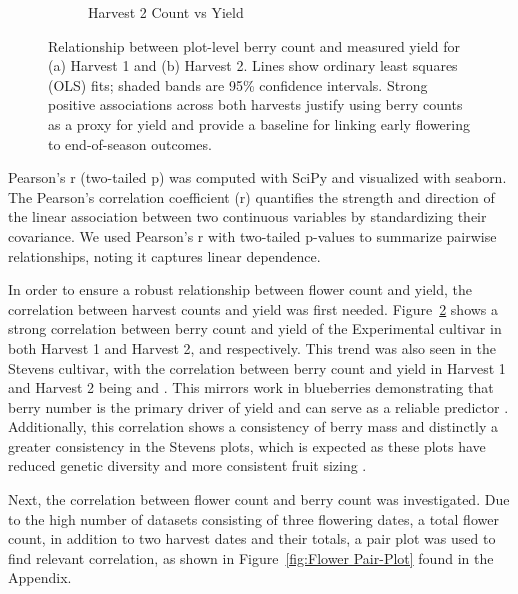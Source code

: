 \begin{figure}[!ht]
\begin{subfigure}{0.45\textwidth}
   \caption{Harvest 2 Count vs Yield}
    \label{fig:H2 count to yield}
  \end{subfigure}
  \caption{Relationship between plot-level berry count and measured yield for (a) Harvest 1 and (b) Harvest 2. Lines show ordinary least squares (OLS) fits; shaded bands are 95\% confidence intervals. Strong positive associations across both harvests justify using berry counts as a proxy for yield and provide a baseline for linking early flowering to end-of-season outcomes.}
  \label{fig:Harvest count comparison}
\end{figure}

 Pearson’s r (two-tailed p) was computed with SciPy \cite{virtanen_scipy_2020} and visualized with seaborn.\cite{waskom_seaborn_2021} The Pearson’s correlation coefficient (r) quantifies the strength and direction of the linear association between two continuous variables by standardizing their covariance. We used Pearson's r with two-tailed p-values to summarize pairwise relationships, noting it captures linear dependence\cite{sedgwick_pearsons_2012}.

 In order to ensure a robust relationship between flower count and yield, the correlation between harvest counts and yield was first needed. Figure~\ref{fig:Harvest count comparison} shows a strong correlation between berry count and yield of the Experimental cultivar in both Harvest 1 and Harvest 2,  and  respectively. This trend was also seen in the Stevens cultivar, with the correlation between berry count and yield in Harvest 1 and Harvest 2 being  and . This mirrors work in blueberries demonstrating that berry number is the primary driver of yield and can serve as a reliable predictor \cite{salvo_estimate_2012,percival_narrow_2012}. Additionally, this correlation shows a consistency of berry mass and distinctly a greater consistency in the Stevens plots, which is expected as these plots have reduced genetic diversity and more consistent fruit sizing \cite{gallardo_breeding_2018}.


Next, the correlation between flower count and berry count was investigated. Due to the high number of datasets consisting of three flowering dates, a total flower count, in addition to two harvest dates and their totals, a pair plot was used to find relevant correlation, as shown in Figure~\ref{fig:Flower Pair-Plot} found in the Appendix. 


